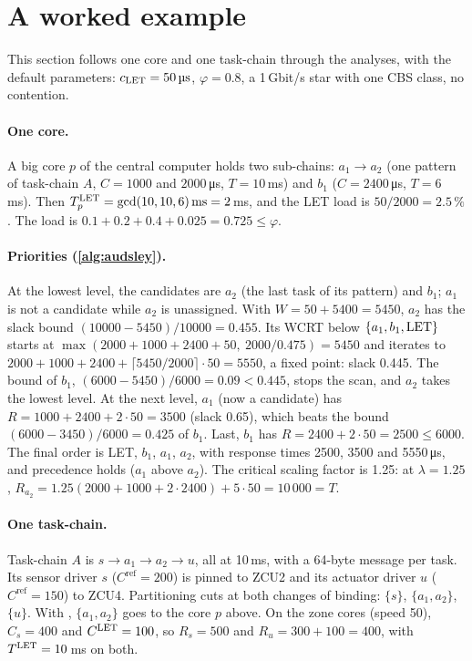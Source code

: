 \section{A worked example}
\label{sec:example}

\begin{inbrief}
This section follows one core and one task-chain through the analyses,
with the default parameters: $c_{\mathrm{LET}}=\SI{50}{\micro s}$, $\varphi=0.8$, a
1\,Gbit/s star with one CBS class, no contention.
\end{inbrief}

\paragraph{One core.} A big core $p$ of the central computer holds two
sub-chains: $a_1\to a_2$ (one pattern of task-chain $A$, $C=1000$ and
$2000$\,\si{\micro s}, $T=10$\,ms) and $b_1$ ($C=2400$\,\si{\micro s},
$T=6$\,ms). Then $T^{\mathrm{LET}}_p=\gcd(10,10,6)\,\mathrm{ms}=2$\,ms, and the LET
load is $50/2000=2.5\,\%$. The load is $0.1+0.2+0.4+0.025=0.725\le\varphi$.

\paragraph{Priorities (\cref{alg:audsley}).} At the lowest level, the
candidates are $a_2$ (the last task of its pattern) and $b_1$; $a_1$ is not
a candidate while $a_2$ is unassigned. With $W=50+5400=5450$, $a_2$ has
the slack bound $(10000-5450)/10000=0.455$. Its WCRT below $\{a_1,b_1,\mathrm{LET}\}$ starts at
$\max(2000+1000+2400+50,\ 2000/0.475)=5450$ and iterates to
$2000+1000+2400+\lceil5450/2000\rceil\cdot50=5550$, a fixed point: slack
0.445. The bound of $b_1$, $(6000-5450)/6000=0.09<0.445$, stops the scan, and
$a_2$ takes the lowest level. At the next level, $a_1$ (now a candidate)
has $R=1000+2400+2\cdot50=3500$ (slack 0.65), which beats the bound
$(6000-3450)/6000=0.425$ of $b_1$. Last, $b_1$ has $R=2400+2\cdot50=2500\le
6000$. The final order is LET, $b_1$, $a_1$, $a_2$, with response times
2500, 3500 and 5550\,\si{\micro s}, and precedence holds ($a_1$ above
$a_2$). The critical scaling factor is 1.25: at $\lambda=1.25$, $R_{a_2}=
1.25(2000+1000+2\cdot2400)+5\cdot50=10\,000=T$.

\paragraph{One task-chain.} Task-chain $A$ is $s\to a_1\to a_2\to u$, all at
10\,ms, with a 64-byte message per task. Its sensor driver $s$
($C^{\mathrm{ref}}=200$) is pinned to ZCU2 and its actuator driver $u$
($C^{\mathrm{ref}}=150$) to ZCU4. Partitioning cuts at both changes of
binding: $\{s\}$, $\{a_1,a_2\}$, $\{u\}$. With \BFDU, $\{a_1,a_2\}$ goes to
the core $p$ above. On the zone cores (speed 50), $C_s=400$ and
$C^{\mathrm{LET}}=100$, so $R_s=500$ and $R_u=300+100=400$, with $T^{\mathrm{LET}}=10$\,ms on
both.

